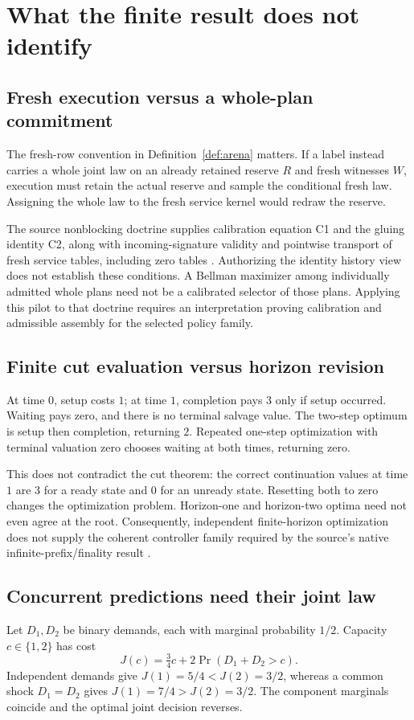 \documentclass[11pt]{article}
\theoremstyle{definition}
\begin{document}
\section{What the finite result does not identify}
\label{sec:boundaries}
\subsection{Fresh execution versus a whole-plan commitment}
The fresh-row convention in Definition~\ref{def:arena} matters. If a label
instead carries a whole joint law on an already retained reserve \(R\)
and fresh witnesses \(W\), execution must retain the actual reserve and
sample the conditional fresh law. Assigning the whole law to the fresh
service kernel would redraw the reserve.

The source nonblocking doctrine supplies calibration equation C1 and the
gluing identity C2, along with incoming-signature validity and pointwise transport of fresh
service tables, including zero tables \cite{nonblocking}. Authorizing the
identity history view does not establish these conditions. A Bellman
maximizer among individually admitted whole plans need not be a calibrated
selector of those plans. Applying this pilot to that doctrine requires
an interpretation proving calibration and admissible assembly for the
selected policy family.

\subsection{Finite cut evaluation versus horizon revision}
At time \(0\), setup costs \(1\); at time \(1\), completion pays \(3\)
only if setup occurred. Waiting pays zero, and there is no terminal
salvage value. The two-step optimum is setup then completion, returning
\(2\). Repeated one-step optimization with terminal valuation zero
chooses waiting at both times, returning zero.

This does not contradict the cut theorem: the correct continuation
values at time \(1\) are \(3\) for a ready state and \(0\) for an unready
state. Resetting both to zero changes the optimization problem.
Horizon-one and horizon-two optima need not even agree at the root.
Consequently, independent finite-horizon optimization does not supply
the coherent controller family required by the source's native
infinite-prefix/finality result \cite{nonblocking}.

\subsection{Concurrent predictions need their joint law}
Let \(D_1,D_2\) be binary demands, each with marginal probability \(1/2\).
Capacity \(c\in\{1,2\}\) has cost
\[
 J(c)=\tfrac34c+2\Pr(D_1+D_2>c).
\]
Independent demands give
\(J(1)=5/4<J(2)=3/2\), whereas a common shock \(D_1=D_2\) gives
\(J(1)=7/4>J(2)=3/2\). The component marginals coincide and the
optimal joint decision reverses.
\end{document}

